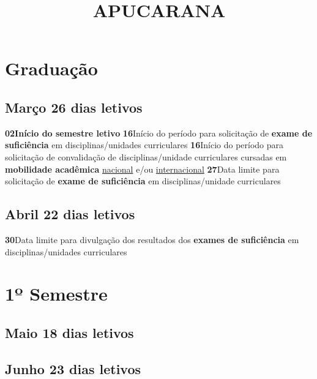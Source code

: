 \documentclass[thesis]{hmcposter}
\author{ }
\title{APUCARANA}
\begin{document}
\begin{poster}
\normalsize\section{\color{hmcorange}Graduação}\subsection{Março \hfill 26 dias letivos}\textbf{02}\qquad \textbf{Início do semestre letivo} \newline \null\textbf{16}\qquad Início do período para solicitação de \textbf{exame de suficiência} em disciplinas/unidades curriculares \newline \null\textbf{16}\qquad Início do período para solicitação de convalidação de disciplinas/unidade curriculares cursadas em \textbf{mobilidade acadêmica} \underline{nacional} e/ou \underline{internacional} \newline \null\textbf{27}\qquad Data limite para solicitação de \textbf{exame de suficiência} em disciplinas/unidade curriculares \newline \null\subsection{Abril \hfill 22 dias letivos}\textbf{30}\qquad Data limite para divulgação dos resultados dos \textbf{exames de suficiência} em disciplinas/unidades curriculares \newline \null\vfill\null
\columnbreak
\section{\hfill \color{hmcorange}1º Semestre}
\subsection{Maio \hfill 18 dias letivos}\subsection{Junho \hfill 23 dias letivos}\newpage

\end{poster}
\end{document}
